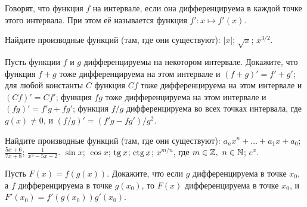 \documentclass[a4paper, 12pt]{article}
\begin{document}
 Говорят, что функция $f$  на интервале,
если она дифференцируема в каждой точке этого интервала. При этом
её  называется функция $f':x\mapsto f'(x)$.


 Найдите производные функций (там, где они существуют):
 $|x|$;
 $\sqrt{x}$;
 $x^{3/2}$.





%


 Пусть функции $f$ и $g$ дифференцируемы на некотором интервале.
Докажите, что
 функция $f+g$ тоже дифференцируема на этом
интервале и $(f+g)'=f'+g'$;
 для любой константы $C$ функция $Cf$ тоже дифференцируема на этом
интервале и $(Cf)'=Cf'$;
 функция $fg$ тоже дифференцируема на этом
интервале и $(fg)'=f'g+fg'$;
 функция $f/g$ дифференцируема во всех точках
интервала, где $g(x)\ne 0$, и $(f/g)'=(f'g-fg')/g^2$.

 Найдите производные функций (там, где они существуют):
 $a_nx^n+\ldots +a_1x+a_0$;
 $\frac{5x+6}{7x+8}$;
 $\frac{1}{x^3-5x-2}$.
 $\sin x$;
 $\cos x$;
 $\tg x$;
 $\ctg x$;
 $x^{m/n}$, где $m\in\mathbb{Z},\ n\in\mathbb{N}$;
 $e^x$.

Пусть $F(x)=f(g(x))$. Докажите, что
если %
$g$ дифференцируема в точке $x_0$, а %
$f$
дифференцируема в точке $g(x_0)$, то $F(x)$ дифференцируема в точке
$x_0$, и $F'(x_0)=f'(g(x_0))g'(x_0)$.
\end{document}
